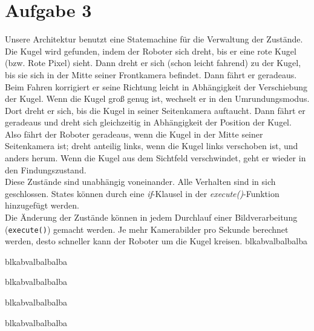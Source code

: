 \documentclass{../Vorlage/mat}
\begin{document}
\section*{Aufgabe 3}
Unsere Architektur benutzt eine Statemachine für die Verwaltung der Zustände.
Die Kugel wird gefunden, indem der Roboter sich dreht, bis er eine rote Kugel (bzw. Rote Pixel) sieht. Dann dreht er sich (schon leicht fahrend) zu der Kugel, bis sie sich in der Mitte seiner Frontkamera befindet. Dann fährt er geradeaus. Beim Fahren korrigiert er seine Richtung leicht in Abhängigkeit der Verschiebung der Kugel. Wenn die Kugel groß genug ist, wechselt er in den Umrundungsmodus. Dort dreht er sich, bis die Kugel in seiner Seitenkamera auftaucht. Dann fährt er geradeaus und dreht sich gleichzeitig in Abhängigkeit der Position der Kugel. Also fährt der Roboter geradeaus, wenn die Kugel in der Mitte seiner Seitenkamera ist; dreht anteilig links, wenn die Kugel links verschoben ist, und anders herum. Wenn die Kugel aus dem Sichtfeld verschwindet, geht er wieder in den Findungszustand.\\
Diese Zustände sind unabhängig voneinander. Alle Verhalten sind in sich geschlossen. States können durch eine \textit{if}-Klausel in der \textit{execute()}-Funktion hinzugefügt werden. \\
Die Änderung der Zustände können in jedem Durchlauf einer Bildverarbeitung (\texttt{execute()}) gemacht werden. Je mehr Kamerabilder pro Sekunde berechnet werden, desto schneller kann der Roboter um die Kugel kreisen.
blkabvalbalbalba

blkabvalbalbalba

blkabvalbalbalba

blkabvalbalbalba

blkabvalbalbalba
\end{document}
